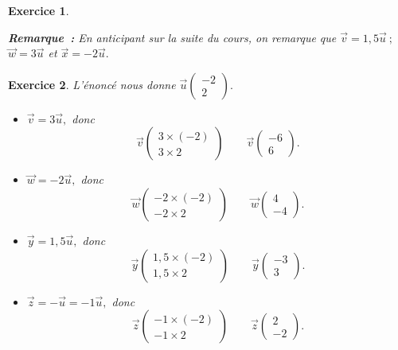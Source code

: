 \documentclass[10pt]{article}
\newtheorem{exo}{Exercice}
\begin{document}
\begin{exo}
\begin{enumerate}
\medskip

\textbf{Remarque~:} En anticipant sur la suite du cours, on remarque que $\overrightarrow{v}=1,5 \overrightarrow{u}~;$ $\overrightarrow{w}=3\overrightarrow{u}$ et $\overrightarrow{x}=-2\overrightarrow{u}.$
\end{enumerate}

\end{exo}




\begin{exo}

L'énoncé nous donne $\overrightarrow{u}\begin{pmatrix} -2\\2\end{pmatrix}.$

\begin{itemize}
\item[\textbullet] $\overrightarrow{v}=3\overrightarrow{u},$ donc \[\overrightarrow{v}\begin{pmatrix} 3\times (-2)\\3\times 2\end{pmatrix}\qquad \overrightarrow{v}\begin{pmatrix} -6\\6\end{pmatrix}.\]
\item[\textbullet] $\overrightarrow{w}=-2\overrightarrow{u},$ donc \[\overrightarrow{w}\begin{pmatrix} -2\times (-2)\\-2\times 2\end{pmatrix}\qquad \overrightarrow{w}\begin{pmatrix} 4\\-4\end{pmatrix}.\]
\item[\textbullet] $\overrightarrow{y}=1,5\overrightarrow{u},$ donc \[\overrightarrow{y}\begin{pmatrix} 1,5\times (-2)\\1,5\times 2\end{pmatrix}\qquad \overrightarrow{y}\begin{pmatrix} -3\\3\end{pmatrix}.\]
\item[\textbullet] $\overrightarrow{z}=-\overrightarrow{u}=-1\overrightarrow{u},$ donc \[\overrightarrow{z}\begin{pmatrix} -1\times (-2)\\-1\times 2\end{pmatrix}\qquad \overrightarrow{z}\begin{pmatrix} 2\\-2\end{pmatrix}.\]
\end{itemize}


\end{exo}
\end{document}
